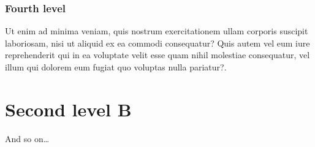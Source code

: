 \documentclass[
  english,
  a4paper,
  openany]{book}
\begin{document}
\hypertarget{fourth-level}{%
\subsubsection{Fourth level}\label{fourth-level}}

Ut enim ad minima veniam, quis nostrum exercitationem ullam corporis suscipit laboriosam, nisi ut aliquid ex ea commodi consequatur? Quis autem vel eum iure reprehenderit qui in ea voluptate velit esse quam nihil molestiae consequatur, vel illum qui dolorem eum fugiat quo voluptas nulla pariatur?.

\hypertarget{second-level-b}{%
\section{Second level B}\label{second-level-b}}

And so on\ldots{}

  
\end{document}
